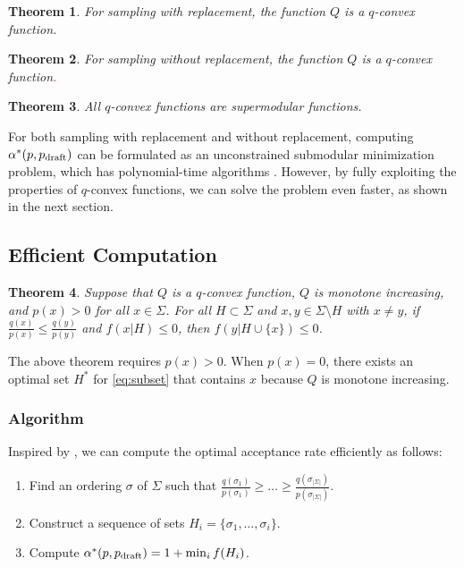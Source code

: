 \documentclass{article}
\newtheorem{theorem}{Theorem}
\begin{document}
\begin{theorem}\label{th:q_convex_wr}
For sampling with replacement, the function $Q$ is a $q$-convex function.
\end{theorem}


\begin{theorem}\label{th:q_convex_wo}
For sampling without replacement, the function $Q$ is a $q$-convex function\textcolor{red}.
\end{theorem}

\begin{theorem}\label{th:q_convex_supermodular}
All $q$-convex functions are supermodular functions.
\end{theorem}

For both sampling with replacement and without replacement, computing $\alpha^\ast(p,p_{\operatorname{draft}})$ can be formulated as an unconstrained submodular minimization problem, which has polynomial-time algorithms \citep{iwata2008submodular}. However, by fully exploiting the properties of $q$-convex functions, we can solve the problem even faster, as shown in the next section.

\subsection{Efficient Computation}\label{se:efficient}
\begin{theorem}\label{th:efficient_computation}
Suppose that $Q$ is a $q$-convex function, $Q$ is monotone increasing, and $p(x)>0$ for all $x\in\Sigma$. For all $H\subset \Sigma$ and $x,y\in \Sigma\setminus H$ with $x\neq y$, if $\frac{q(x)}{p(x)}\leq\frac{q(y)}{p(y)}$ and $f(x|H)\leq0$, then $f(y|H\cup\{x\})\leq0$.
\end{theorem}

The above theorem requires $p(x)>0$. When $p(x)=0$, there exists an optimal set $H^\ast$ for \eqref{eq:subset} that contains $x$ because $Q$ is monotone increasing.

\subsubsection{Algorithm}
Inspired by , we can compute the optimal acceptance rate efficiently as follows:
\begin{enumerate}[leftmargin=*,noitemsep=0mm,topsep=-2pt]
\item Find an ordering $\sigma$ of $\Sigma$ such that $\frac{q(\sigma_1)}{p(\sigma_1)}\geq\dots\geq\frac{q(\sigma_{|\Sigma|})}{p(\sigma_{|\Sigma|})}$.
\item Construct a sequence of sets $H_i = \{\sigma_1,\dots,\sigma_i\}$.
\item Compute $\alpha^\ast(p,p_{\operatorname{draft}})=
1+\min_{i} f(H_i)$.
\end{enumerate}
\end{document}
